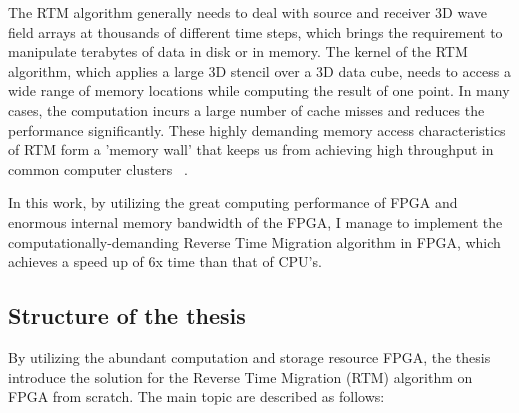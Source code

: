 The RTM algorithm generally needs to deal with source and receiver
3D wave field arrays at thousands of different time steps, which brings
the requirement to manipulate terabytes of data in disk or in memory.
The kernel of the RTM algorithm, which applies a large 3D stencil
over a 3D data cube, needs to access a wide range of memory locations
while computing the result of one point. In many cases, the computation
incurs a large number of cache misses and reduces the performance
significantly. These highly demanding memory access characteristics
of RTM form a 'memory wall' that keeps us from achieving high throughput
in common computer clusters ~\cite{fu11}.

In this work, by utilizing the great computing performance of FPGA
and enormous internal memory bandwidth of the FPGA, I manage to implement
the computationally-demanding Reverse Time Migration algorithm in
FPGA, which achieves a speed up of 6x time than that of CPU's.

\subsection{Structure of the thesis}

By utilizing the abundant computation and storage resource FPGA, the thesis
introduce the solution for the Reverse Time Migration (RTM) algorithm on
FPGA from scratch. The main topic are described as follows:

